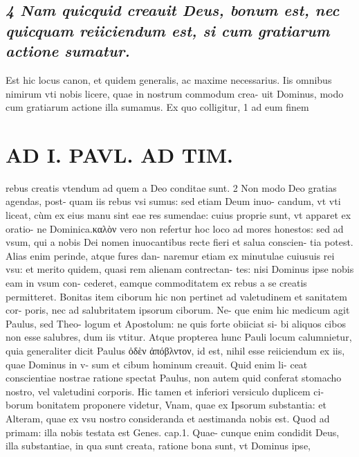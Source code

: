 \documentclass{article}
\begin{document}
\begin{pages}
\subsection*{\textit{4 Nam quicquid creauit Deus, bonum est, nec quicquam reiiciendum est, si cum gratiarum actione sumatur. }}\pstart Est hic locus canon, et quidem generalis, ac maxime necessarius. Iis omnibus nimirum vti nobis licere, quae in nostrum commodum crea- uit Dominus, modo cum gratiarum actione illa sumamus. Ex quo colligitur, 1 ad eum finem  \pend
\section*{AD I. PAVL. AD TIM. }
\marginpar{[ p.196 ]}\pstart rebus creatis vtendum ad quem a Deo conditae sunt. 2 Non modo Deo gratias agendas, post- quam iis rebus vsi sumus: sed etiam Deum inuo- candum, vt vti liceat, cùm ex eius manu sint eae res sumendae: cuius proprie sunt, vt apparet ex oratio- ne Dominica.καλὸν vero non refertur hoc loco ad mores honestos: sed ad vsum, qui a nobis Dei nomen inuocantibus recte fieri et salua conscien- tia potest. Alias enim perinde, atque fures dan- naremur etiam ex minutulae cuiusuis rei vsu: et merito quidem, quasi rem alienam contrectan- tes: nisi Dominus ipse nobis eam in vsum con- cederet, eamque commoditatem ex rebus a se creatis permitteret. Bonitas item ciborum hic non pertinet ad valetudinem et sanitatem cor- poris, nec ad salubritatem ipsorum ciborum. Ne- que enim hic medicum agit Paulus, sed Theo- logum et Apostolum: ne quis forte obiiciat si- bi aliquos cibos non esse salubres, dum iis vtitur. Atque propterea hunc Pauli locum calumnietur, quia generaliter dicit Paulus ὀδὲν ἀπόβλντον, id est, nihil esse reiiciendum ex iis, quae Dominus in v- sum et cibum hominum creauit. Quid enim li- ceat conscientiae nostrae ratione spectat Paulus, non autem quid conferat stomacho nostro, vel valetudini corporis.  \pend\pstart Hic tamen et inferiori versiculo duplicem ci- borum bonitatem proponere videtur, Vnam, quae ex Ipsorum substantia: et Alteram, quae ex vsu nostro consideranda et aestimanda nobis est. Quod ad primam: illa nobis testata est Genes. cap.1. Quae- cunque enim condidit Deus, illa substantiae, in qua sunt creata, ratione bona sunt, vt Dominus ipse,  \pend

\end{pages}
\end{document}
